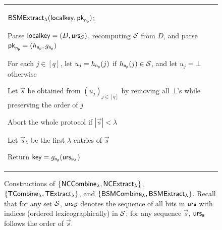 \begin{figure}[h!]
\begin{center}
{\begin{tabular}{ll}
\begin{minipage}[t]{0.7\textwidth}
    	\underline{$\mathsf{BSMExtract}_{\lambda}(\mathsf{localkey}, \mathsf{pk}_{\mathsf{n_p}})$:}
	\item Parse $\mathsf{localkey}=(D,\mathsf{urs}_{\mathcal{S}})$, recomputing $\mathcal{S}$ from $D$, and parse $\mathsf{pk}_{\mathsf{n_p}}=(h_{\mathsf{n_p}},g_{\mathsf{n_p}})$
	\item For each $j\in[q]$, let $u_j=h_{\mathsf{n_p}}(j)$ if $h_{\mathsf{n_p}}(j)\in\mathcal{S}$, and let $u_j=\bot$ otherwise
	\item Let $\vec s$ be obtained from $(u_j)_{j\in[q]}$ by removing all $\bot$'s while preserving the order of $j$
	\item Abort the whole protocol if $|\vec s|< \lambda$
	\item Let $\vec{s}_\lambda$ be the first $\lambda$ entries of $\vec s$
	\item Return $\mathsf{key}=g_{\mathsf{n_p}}(\mathsf{urs}_{\mathbf{s}_\lambda})$
    \end{minipage} 
      \end{tabular}
      }
\end{center}
\caption{Constructions of $\{\mathsf{NCCombine}_{\lambda}, \mathsf{NCExtract}_{\lambda}\}$, $\{\mathsf{TCombine}_{\lambda},\mathsf{TExtract}_{\lambda}\}$, and $\{\mathsf{BSMCombine}_{\lambda}, \mathsf{BSMExtract}_{\lambda}\}$. Recall that for any set $\mathcal{S}$, $\mathsf{urs}_{\mathcal{S}}$ denotes the sequence of all bits in $\mathsf{urs}$ with indices (ordered lexicographically) in $\mathcal{S}$; for any sequence $\vec s$, $\mathsf{urs}_{\mathbf{s}}$ follows the order of $\vec s$.}
\label{fig:con-extendable-bsmke}
\end{figure}
